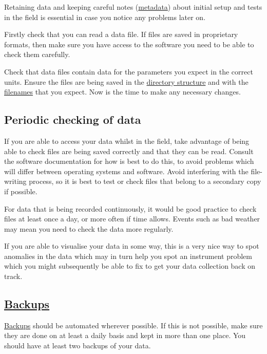 \documentclass[a4paper,oneside]{report}
\begin{document}
Retaining data and keeping careful notes
(\protect\hyperlink{metadata}{metadata}) about initial setup and tests
in the field is essential in case you notice any problems later on.

Firstly check that you can read a data file. If files are saved in
proprietary formats, then make sure you have access to the software you
need to be able to check them carefully.

Check that data files contain data for the parameters you expect in the
correct units. Ensure the files are being saved in the
\protect\hyperlink{directory-structure}{directory structure} and with
the \protect\hyperlink{file-naming}{filenames} that you expect. Now is
the time to make any necessary changes.

\hypertarget{periodic-checking-of-data}{%
\subsection{Periodic checking of data}\label{periodic-checking-of-data}}

If you are able to access your data whilst in the field, take advantage
of being able to check files are being saved correctly and that they can
be read. Consult the software documentation for how is best to do this,
to avoid problems which will differ between operating systems and
software. Avoid interfering with the file-writing process, so it is best
to test or check files that belong to a secondary copy if possible.

For data that is being recorded continuously, it would be good practice
to check files at least once a day, or more often if time allows. Events
such as bad weather may mean you need to check the data more regularly.

If you are able to visualise your data in some way, this is a very nice
way to spot anomalies in the data which may in turn help you spot an
instrument problem which you might subsequently be able to fix to get
your data collection back on track.

\hypertarget{backups}{%
\subsection{\texorpdfstring{\protect\hyperlink{backing-up-data}{Backups}}{Backups}}\label{backups}}

\protect\hyperlink{backing-up-data}{Backups} should be automated
wherever possible. If this is not possible, make sure they are done on
at least a daily basis and kept in more than one place. You should have
at least two backups of your data.
\end{document}
